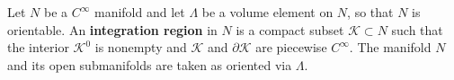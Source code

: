 Let $N$ be a $C^\infty$ manifold and let $\Lambda$ be a volume element on $N$, so that $N$ is orientable. An \textbf{integration region} in $N$ is a compact subset $\mathcal{K} \subset N$ such that the interior $\mathcal{K}^0$ is nonempty and $\mathcal{K}$ and $\partial \mathcal{K}$ are piecewise $C^\infty$. The manifold $N$ and its open submanifolds are taken as oriented via $\Lambda$.
